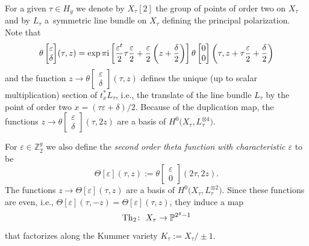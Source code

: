 \documentclass[pdftex]{sigma}
\numberwithin{equation}{section}
\newcommand{\de}{\delta}
\newcommand{\ep}{\varepsilon}
\newcommand{\PP}{{\mathbb{P}}}
\newcommand{\ZZ}{{\mathbb{Z}}}
\def\ZZ{{\mathbb Z}}
\def\t{\theta}
\def\T{\Theta}
\def\tt#1#2{{\t\left[\begin{matrix}{#1}\\ {#2}\end{matrix}\right]}}
\begin{document}
For a given $\tau \in H_g$ we denote by $X_{\tau}[2]$ the group of points of order two on $X_{\tau}$ and by $L_{\tau}$ a~symmetric line bundle on $X_\tau$ defining the principal polarization. Note that
\[
\tt\ep\de(\tau,z)=\exp \pi {\rm i} \left[\frac{\ep^t}{2}\tau\frac{\ep}{2} +\frac{\ep}{2}\left(z+\frac{\de}{2}\right) \right]\tt{0}{0}\left( \tau,z+ \tau\frac{\ep}{2} +\frac{\de}{2} \right)
\]
and the function $z \to
\theta\left[\begin{smallmatrix}\ep \\ \de \end{smallmatrix}\right] (\tau,z)$ defines the unique (up to scalar multiplication)
section of $t_x^*L_{\tau}$, i.e., the translate of the line bundle $L_{\tau}$ by the point of order two $x=(\tau \ep +\de)/2$. Because of the duplication map, the functions $z \rightarrow
\theta\left[\begin{smallmatrix}\ep \\ \de \end{smallmatrix}\right] (\tau,2z)$ are a basis of $H^0\big(X_\tau, L_{\tau}^{\otimes 4}\big)$.

For $\ep\in\ZZ_2^g$ we also
define the {\it second order theta function with characteristic $\ep$} to
be
\[
\T[\ep](\tau,z):=\tt{\ep}{0}(2\tau,2z).
\]
The functions $z \rightarrow \T[\ep](\tau,z)$ are a basis of $H^0\big(X_\tau, L_{\tau}^{\otimes 2}\big)$. Since these functions are even, i.e., $
\T[\ep](\tau,-z)=
\T[\ep](\tau,z)$, they induce a map
\[
{\rm Th}_2\colon \ X_\tau\to \PP^{2^g-1}
\]
 that factorizes along the Kummer variety $ K_{\tau}:=X_\tau/\pm 1$.
\end{document}

